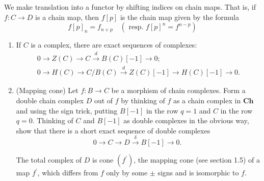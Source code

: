 We make translation into a functor by shifting indices on chain maps. That is, if $f: C \rightarrow D$ is a chain map, then $f[p]$ is the chain map given by the formula
$$
f[p]_n=f_{n+p} \quad\left(\text { resp. } f[p]^n=f^{n-p}\right)
$$ 

\begin{prop}
    \begin{enumerate}
        \item If $C$ is a complex, there are exact sequences of complexes:
        $$
        \begin{gathered}
        0 \longrightarrow Z(C) \longrightarrow C \xrightarrow{d} B(C)[-1] \longrightarrow 0 ; \\
        0 \longrightarrow H(C) \longrightarrow C / B(C) \xrightarrow{d} Z(C)[-1] \longrightarrow H(C)[-1] \longrightarrow 0 .
        \end{gathered}
        $$
        
        \item (Mapping cone) Let $f: B \rightarrow C$ be a morphism of chain complexes. Form a double chain complex $D$ out of $f$ by thinking of $f$ as a chain complex in $\mathbf{C h}$ and using the sign trick, putting $B[-1]$ in the row $q=1$ and $C$ in the row $q=0$. Thinking of $C$ and $B[-1]$ as double complexes in the obvious way, show that there is a short exact sequence of double complexes
        $$
        0 \longrightarrow C \longrightarrow D \xrightarrow{\delta} B[-1] \longrightarrow 0 \text {. }
        $$
        
        The total complex of $D$ is cone $\left(f^{\prime}\right)$, the mapping cone (see section 1.5) of a map $f^{\prime}$, which differs from $f$ only by some $\pm$ signs and is isomorphic to $f$.
    \end{enumerate}
\end{prop}




